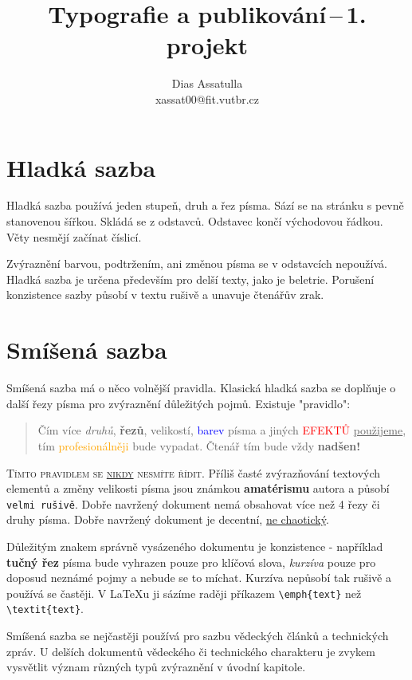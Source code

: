 \documentclass[10pt,a4paper,twocolumn]{article}
\title{Typografie a publikování\,\---\,1. projekt}
\author{Dias Assatulla \\ xassat00@fit.vutbr.cz}
\date{}
\newcommand*\chancery{\fontfamily{pzc}\selectfont}
\begin{document}
\maketitle
\section{Hladká sazba}
Hladká sazba používá jeden stupeň, druh a řez písma.
Sází se na stránku s pevně stanovenou šířkou.
Skládá se z odstavců. Odstavec končí východovou řádkou.
Věty nesmějí začínat číslicí.

Zvýraznění barvou, podtržením, ani změnou písma se v odstavcích nepoužívá.
Hladká sazba je určena především pro delší texty, jako je beletrie.
Porušení konzistence sazby působí v textu rušivě a unavuje čtenářův zrak.

\section{Smíšená sazba}
Smíšená sazba má o něco volnější pravidla.
Klasická hladká sazba se doplňuje o další řezy písma pro zvýraznění důležitých pojmů.
Existuje "pravidlo":

\begin{quotation}
Čím více \textit{druhů}, \textbf{řezů}, {\LARGE velikostí}, \textcolor{blue}{barev} písma a jiných \textcolor{red}{\footnotesize{EFEKTŮ}} \underline{použijeme}, tím \textcolor{orange}{profesionálněji} bude {\chancery{\Large{\textbf{dokument}}}} vypadat. {\tiny Čtenář} tím bude vždy {\textbf{\Huge{nadšen!}}}
\end{quotation}
    
\textsc{Tímto pravidlem se \underline{nikdy} nesmíte řídit.} Příliš časté zvýrazňování textových elementů a změny {\tiny velikosti} písma jsou známkou \textbf{amatérismu} autora a působí \texttt{velmi rušivě}. %
Dobře navržený dokument nemá obsahovat více než 4 řezy či druhy písma.
Dobře navržený dokument je decentní, \underline{ne chaotický}.

Důležitým znakem správně vysázeného dokumentu je konzistence - například \textbf{tučný řez} písma bude vyhrazen pouze pro klíčová slova, \textit{kurzíva} pouze pro doposud neznámé pojmy a nebude se to míchat.
Kurzíva nepůsobí tak rušivě a používá se častěji.
V {\LaTeX u}  ji sázíme raději příkazem \texttt{\textbackslash emph\{text\}} než \texttt{\textbackslash textit\{text\}}.

Smíšená sazba se nejčastěji používá pro sazbu vědeckých článků a technických zpráv.
U delších dokumentů vědeckého či technického charakteru je zvykem vysvětlit význam různých typů zvýraznění v úvodní kapitole.
\end{document}

